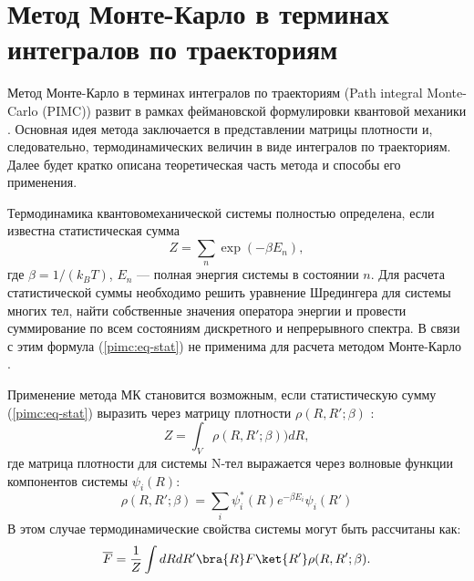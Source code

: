 \section{Метод Монте-Карло в терминах интегралов по траекториям}

Метод Монте-Карло в терминах интегралов по траекториям (Path integral Monte-Carlo (PIMC)) развит в рамках феймановской формулировки квантовой механики \cite{Zelener1981theor}.  
Основная идея метода заключается в представлении матрицы плотности и, следовательно, термодинамических величин в виде интегралов по траекториям. Далее будет кратко описана теоретическая часть метода и способы его применения. 

Термодинамика квантовомеханической системы полностью определена, если известна статистическая 
сумма
\begin{equation}\label{pimc:eq-stat}
	Z = \sum_n\exp(-\beta E_n),
\end{equation} 
где $\beta=1/(k_BT)$, $E_n$ --- полная энергия системы в состоянии $n$.
Для расчета статистической суммы необходимо решить уравнение Шредингера для системы многих тел, найти собственные значения оператора энергии и провести суммирование по всем состояниям дискретного и непрерывного спектра. В связи с этим формула (\ref{pimc:eq-stat}) не применима для расчета методом Монте-Карло \cite{Zamalin77}. 

Применение метода МК становится возможным, если статистическую сумму (\ref{pimc:eq-stat}) выразить через матрицу плотности 
$\rho(R,R';\beta)$ \cite{hill1960introduction}:
\begin{equation}\label{pimc:eq-stat_rho} 
	Z = \int_V \rho(R,R';\beta))dR,
\end{equation}
где матрица плотности для системы N-тел выражается через волновые функции компонентов системы $\psi_i(R)$:
\begin{equation}
	\label{pimc:eq-rho-matrix}
	\rho(R,R';\beta)=\sum_i \psi_i^*(R)e^{-\beta E_i} \psi_i(R')
\end{equation}
В этом случае термодинамические свойства системы могут быть рассчитаны как:
\begin{equation}	\label{pimc:eq-thrm-func}
	 \overline{F}  = \frac{1}{Z}\int dR dR' \bra{R}F\ket{R'}\rho(R,R';\beta).
\end{equation}

